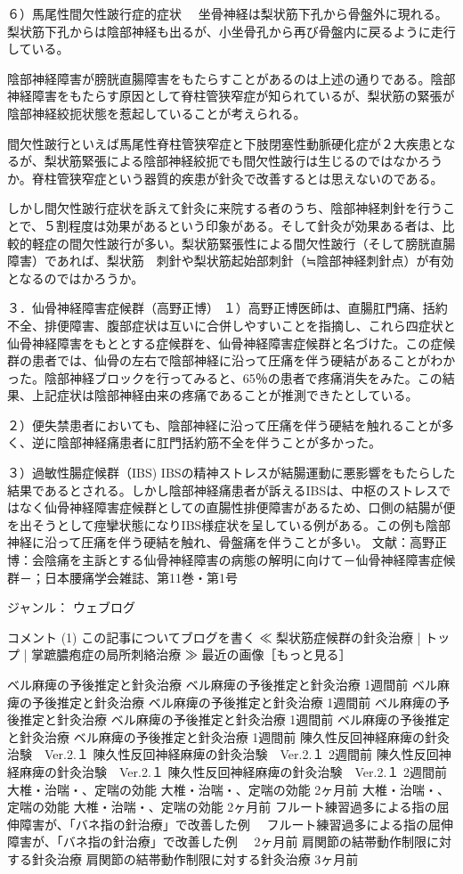 ６）馬尾性間欠性跛行症的症状　
坐骨神経は梨状筋下孔から骨盤外に現れる。梨状筋下孔からは陰部神経も出るが、小坐骨孔から再び骨盤内に戻るように走行している。

陰部神経障害が膀胱直腸障害をもたらすことがあるのは上述の通りである。陰部神経障害をもたらす原因として脊柱管狭窄症が知られているが、梨状筋の緊張が陰部神経絞扼状態を惹起していることが考えられる。

間欠性跛行といえば馬尾性脊柱管狭窄症と下肢閉塞性動脈硬化症が２大疾患となるが、梨状筋緊張による陰部神経絞扼でも間欠性跛行は生じるのではなかろうか。脊柱管狭窄症という器質的疾患が針灸で改善するとは思えないのである。

しかし間欠性跛行症状を訴えて針灸に来院する者のうち、陰部神経刺針を行うことで、５割程度は効果があるという印象がある。そして針灸が効果ある者は、比較的軽症の間欠性跛行が多い。梨状筋緊張性による間欠性跛行（そして膀胱直腸障害）であれば、梨状筋　刺針や梨状筋起始部刺針（≒陰部神経刺針点）が有効となるのではかろうか。

３．仙骨神経障害症候群（高野正博）
１）高野正博医師は、直腸肛門痛、括約不全、排便障害、腹部症状は互いに合併しやすいことを指摘し、これら四症状と仙骨神経障害をもととする症候群を、仙骨神経障害症候群と名づけた。この症候群の患者では、仙骨の左右で陰部神経に沿って圧痛を伴う硬結があることがわかった。陰部神経ブロックを行ってみると、65％の患者で疼痛消失をみた。この結果、上記症状は陰部神経由来の疼痛であることが推測できたとしている。

２）便失禁患者においても、陰部神経に沿って圧痛を伴う硬結を触れることが多く、逆に陰部神経痛患者に肛門括約筋不全を伴うことが多かった。　　

３）過敏性腸症候群（IBS)
IBSの精神ストレスが結腸運動に悪影響をもたらした結果であるとされる。しかし陰部神経痛患者が訴えるIBSは、中枢のストレスではなく仙骨神経障害症候群としての直腸性排便障害があるため、口側の結腸が便を出そうとして痙攣状態になりIBS様症状を呈している例がある。この例も陰部神経に沿って圧痛を伴う硬結を触れ、骨盤痛を伴うことが多い。
文献：高野正博：会陰痛を主訴とする仙骨神経障害の病態の解明に向けて－仙骨神経障害症候群－；日本腰痛学会雑誌、第11巻・第1号

ジャンル：
    ウェブログ

コメント (1)   この記事についてブログを書く
≪ 梨状筋症候群の針灸治療 | トップ | 掌蹠膿疱症の局所刺絡治療 ≫
最近の画像［もっと見る］

    ベル麻痺の予後推定と針灸治療 ベル麻痺の予後推定と針灸治療
    1週間前
    ベル麻痺の予後推定と針灸治療 ベル麻痺の予後推定と針灸治療
    1週間前
    ベル麻痺の予後推定と針灸治療 ベル麻痺の予後推定と針灸治療
    1週間前
    ベル麻痺の予後推定と針灸治療 ベル麻痺の予後推定と針灸治療
    1週間前
    陳久性反回神経麻痺の針灸治験　Ver.2.１ 陳久性反回神経麻痺の針灸治験　Ver.2.１
    2週間前
    陳久性反回神経麻痺の針灸治験　Ver.2.１ 陳久性反回神経麻痺の針灸治験　Ver.2.１
    2週間前
    大椎・治喘・、定喘の効能 大椎・治喘・、定喘の効能
    2ヶ月前
    大椎・治喘・、定喘の効能 大椎・治喘・、定喘の効能
    2ヶ月前
    フルート練習過多による指の屈伸障害が、「バネ指の針治療」で改善した例　 フルート練習過多による指の屈伸障害が、「バネ指の針治療」で改善した例　
    2ヶ月前
    肩関節の結帯動作制限に対する針灸治療 肩関節の結帯動作制限に対する針灸治療
    3ヶ月前

